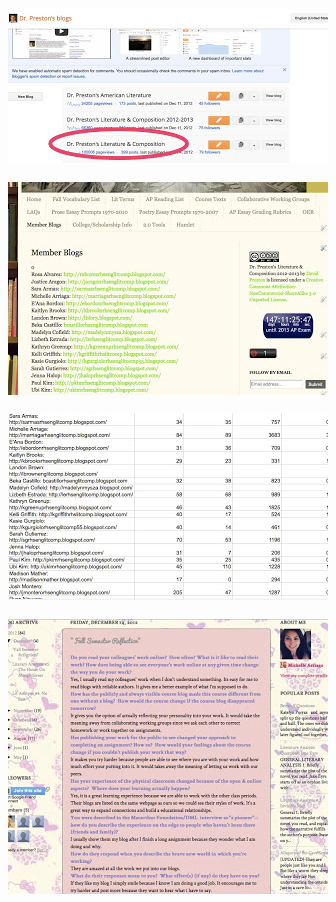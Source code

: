 \begin{center}
\includegraphics{../pictures/osl_views.jpg}
\end{center}

\begin{center}
\includegraphics{../pictures/osl_blogs.jpg}
\end{center}

\begin{center}
\includegraphics{../pictures/osl_analytics.jpg}
\end{center}

\begin{center}
\includegraphics{../pictures/fall_reflection.jpg}
\end{center}

